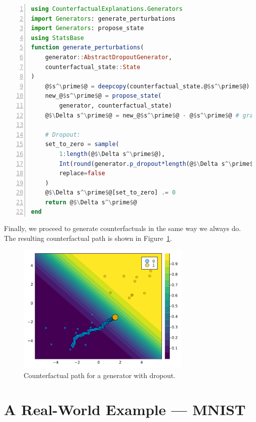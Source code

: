 \documentclass[
  letterpaper,
  DIV=11,
  numbers=noendperiod]{scrartcl}
\begin{document}
\begin{lstlisting}[language=Julia, escapechar=@, numbers=left, label={lst:generate}, caption={}]
using CounterfactualExplanations.Generators
import Generators: generate_perturbations
import Generators: propose_state
using StatsBase
function generate_perturbations(
    generator::AbstractDropoutGenerator, 
    counterfactual_state::State
)
    @$s^\prime$@ = deepcopy(counterfactual_state.@$s^\prime$@)
    new_@$s^\prime$@ = propose_state(
        generator, counterfactual_state)
    @$\Delta s^\prime$@ = new_@$s^\prime$@ - @$s^\prime$@ # gradient step

    # Dropout:
    set_to_zero = sample(
        1:length(@$\Delta s^\prime$@),
        Int(round(generator.p_dropout*length(@$\Delta s^\prime$@))),
        replace=false
    )
    @$\Delta s^\prime$@[set_to_zero] .= 0
    return @$\Delta s^\prime$@
end
\end{lstlisting}

Finally, we proceed to generate counterfactuals in the same way we
always do. The resulting counterfactual path is shown in
Figure~\ref{fig-dropout}.

\begin{figure}

{\centering \includegraphics[width=3.33333in,height=2.5in]{www/dropout.png}

}

\caption{\label{fig-dropout}Counterfactual path for a generator with
dropout.}

\end{figure}

\hypertarget{sec-emp}{%
\section{A Real-World Example --- MNIST}\label{sec-emp}}
\end{document}

